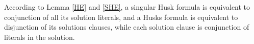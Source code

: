 \documentclass[conference,compsocconf]{IEEEtran}
\begin{document}
% 
%  

%         
%                 
According to Lemma \ref{HE} and \ref{SHE},
a singular Husk formula is equivalent to conjunction of all its solution literals,
and a Husks formula is equivalent to disjunction of its solutions clauses, 
while each solution clause is conjunction of literals in the solution.
\end{document}

